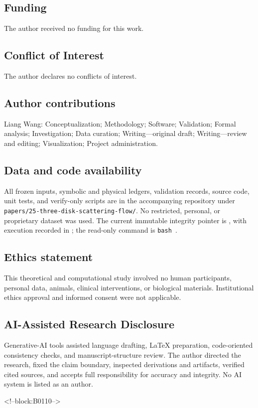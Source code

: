 \documentclass[11pt,a4paper]{article}
\theoremstyle{definition}
\theoremstyle{remark}
\begin{document}
\subsection*{Funding}
The author received no funding for this work.
\subsection*{Conflict of Interest}
The author declares no conflicts of interest.
\subsection*{Author contributions}
Liang Wang: Conceptualization; Methodology; Software; Validation; Formal analysis; Investigation; Data curation; Writing---original draft; Writing---review and editing; Visualization; Project administration.
\subsection*{Data and code availability}
All frozen inputs, symbolic and physical ledgers, validation records, source code, unit tests, and verify-only scripts are in the accompanying repository under \texttt{papers/25-three-disk-scattering-flow/}. No restricted, personal, or proprietary dataset was used. The current immutable integrity pointer is , with execution recorded in ; the read-only command is \texttt{bash }.
\subsection*{Ethics statement}
This theoretical and computational study involved no human participants, personal data, animals, clinical interventions, or biological materials. Institutional ethics approval and informed consent were not applicable.
\subsection*{AI-Assisted Research Disclosure}
Generative-AI tools assisted language drafting, LaTeX preparation, code-oriented consistency checks, and manuscript-structure review. The author directed the research, fixed the claim boundary, inspected derivations and artifacts, verified cited sources, and accepts full responsibility for accuracy and integrity. No AI system is listed as an author.

<!--block:B0110-->


\end{document}
